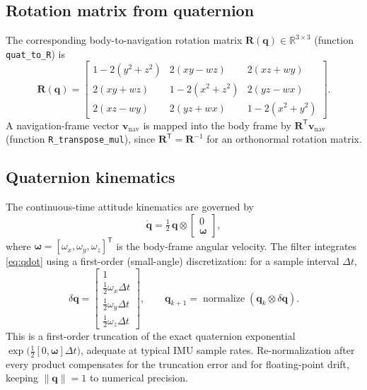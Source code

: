\documentclass[11pt]{article}
\newcommand{\vect}[1]{\bm{#1}}
\newcommand{\mat}[1]{\bm{#1}}
\newcommand{\R}{\mathbb{R}}
\newcommand{\quat}{\vect{q}}
\newcommand{\transpose}{^{\mathsf{T}}}
\begin{document}
\subsection{Rotation matrix from quaternion}

The corresponding body-to-navigation rotation matrix $\mat R(\quat)\in\R^{3\times3}$ (function \texttt{quat\_to\_R}) is
\begin{equation}
\mat R(\quat) =
\begin{bmatrix}
1-2(y^2+z^2) & 2(xy-wz) & 2(xz+wy) \\
2(xy+wz) & 1-2(x^2+z^2) & 2(yz-wx) \\
2(xz-wy) & 2(yz+wx) & 1-2(x^2+y^2)
\end{bmatrix}.
\label{eq:R}
\end{equation}
A navigation-frame vector $\vect v_{\text{nav}}$ is mapped into the body frame by $\mat R\transpose \vect v_{\text{nav}}$ (function \texttt{R\_transpose\_mul}), since $\mat R\transpose = \mat R^{-1}$ for an orthonormal rotation matrix.

\subsection{Quaternion kinematics}

The continuous-time attitude kinematics are governed by
\begin{equation}
\dot{\quat} = \tfrac{1}{2}\, \quat \otimes \begin{bmatrix}0\\ \vect\omega\end{bmatrix},
\label{eq:qdot}
\end{equation}
where $\vect\omega = [\omega_x,\omega_y,\omega_z]\transpose$ is the body-frame angular velocity. The filter integrates \eqref{eq:qdot} using a first-order (small-angle) discretization: for a sample interval $\Delta t$,
\begin{equation}
\delta\quat = \begin{bmatrix} 1 \\ \tfrac12\omega_x\Delta t \\ \tfrac12\omega_y\Delta t \\ \tfrac12\omega_z\Delta t\end{bmatrix},
\qquad
\quat_{k+1} = \operatorname{normalize}\!\left(\quat_k \otimes \delta\quat\right).
\label{eq:qint}
\end{equation}
This is a first-order truncation of the exact quaternion exponential $\exp\!\big(\tfrac12[0,\vect\omega]\Delta t\big)$, adequate at typical IMU sample rates. Re-normalization after every product compensates for the truncation error and for floating-point drift, keeping $\lVert \quat\rVert=1$ to numerical precision.
\end{document}
